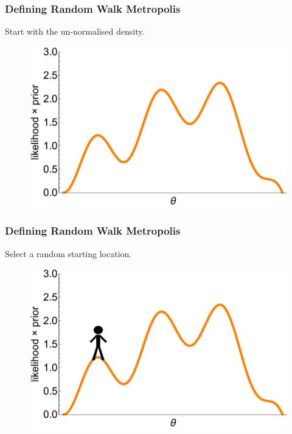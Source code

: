 \documentclass[handout]{beamer}
\begin{document}
\begin{frame}
\frametitle{Defining Random Walk Metropolis}
Start with the un-normalised density.

\begin{figure}[ht]
\centerline{\includegraphics[width=1\textwidth]{./Figures/lec4_metropolisDefinition1.pdf}}
\end{figure}

\end{frame}

\begin{frame}
\frametitle{Defining Random Walk Metropolis}
Select a random starting location.

\begin{figure}[ht]
\centerline{\includegraphics[width=1\textwidth]{./Figures/lec4_metropolisDefinition2.pdf}}
\end{figure}

\end{frame}
\end{document}
